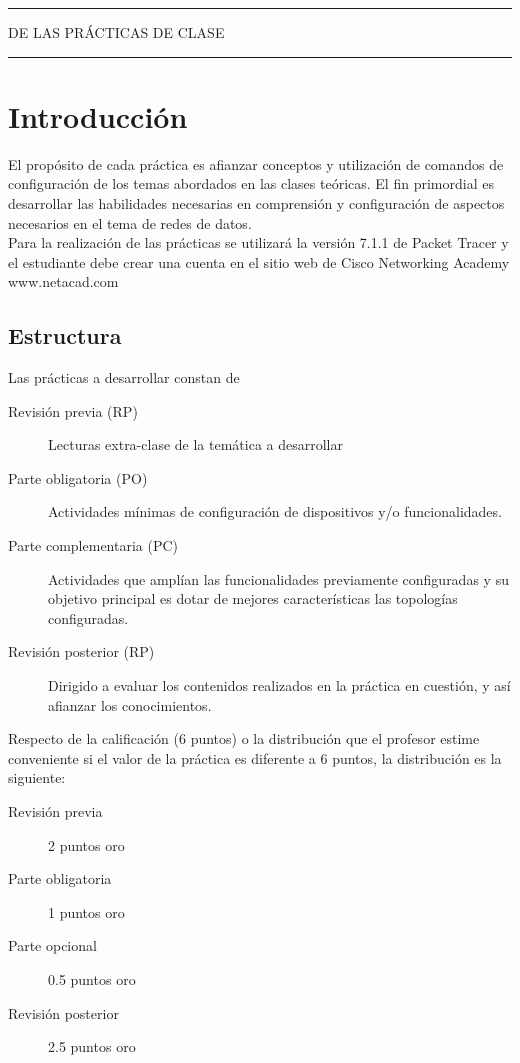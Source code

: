 \documentclass[12pt]{article}
\begin{document}

\begin{center}


\noindent\rule{\textwidth}{1pt}
\huge{DE LAS PRÁCTICAS DE CLASE}
\noindent\rule{\textwidth}{1pt}
\end{center}
 
 \section{Introducción}
El propósito de cada práctica es afianzar conceptos y utilización de comandos de configuración de los temas abordados en las clases teóricas. El fin primordial es desarrollar las habilidades necesarias en comprensión y configuración de aspectos necesarios en el tema de redes de datos.\\

Para la realización de las prácticas se utilizará la versión 7.1.1 de Packet Tracer y el estudiante debe crear una cuenta en el sitio web de Cisco Networking Academy www.netacad.com
 \subsection{Estructura}
Las prácticas a desarrollar constan de 
\begin{description}
\item[Revisión previa (RP)] Lecturas extra-clase de la temática a desarrollar
\item[Parte obligatoria (PO)] Actividades mínimas de configuración de dispositivos y/o funcionalidades.
\item[Parte complementaria (PC)] Actividades que amplían las funcionalidades previamente configuradas y su objetivo principal es dotar de mejores características las topologías configuradas.
\item[Revisión posterior (RP)] Dirigido a evaluar los contenidos realizados en la práctica en cuestión, y así afianzar los conocimientos.
\end{description}
\vspace{10px}
Respecto de la calificación (6 puntos) o la distribución que el profesor estime conveniente si el valor de la práctica es diferente a 6 puntos, la distribución es la siguiente:
\begin{description}
\item[Revisión previa] 2 puntos oro
\item[Parte obligatoria] 1 puntos oro
\item[Parte opcional]  0.5 puntos oro
\item[Revisión posterior] 2.5 puntos oro
\end{description}
\end{document}
